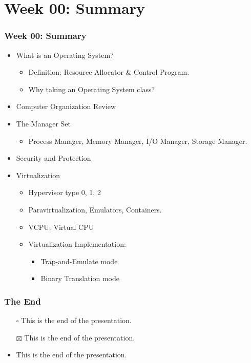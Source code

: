\documentclass[aspectratio=169, xcolor=table, notheorems, hyperref={pdfpagelabels=false}]{beamer}
\begin{document}
\section{Week 00: Summary}
\begin{frame}
\frametitle{Week 00: Summary}
\begin{itemize}
\item What is an Operating System?
\begin{itemize}
\item Definition: Resource Allocator \& Control Program.
\item Why taking an Operating System class?
\end{itemize}
\item Computer Organization Review
\item The Manager Set
\begin{itemize}
\item Process Manager, Memory Manager, I/O Manager, Storage Manager.
\end{itemize}
\item Security and Protection
\item Virtualization
\begin{itemize}
\item Hypervisor type 0, 1, 2
\item Paravirtualization, Emulators, Containers.
\item VCPU: Virtual CPU
\item Virtualization Implementation:
\begin{itemize}
\item Trap-and-Emulate mode
\item Binary Translation mode
\end{itemize}
\end{itemize}
\end{itemize}
\end{frame}




\begin{frame}
\frametitle{The End}
\begin{itemize}
\item[$\square$] This is the end of the presentation.
\item[$\boxtimes$] This is the end of the presentation.
\item This is the end of the presentation.
\end{itemize}
\end{frame}

\end{document}
